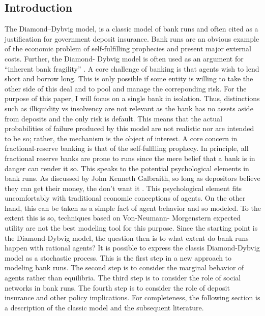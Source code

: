 \documentclass[12pt]{article}
\begin{document}
\begin{doublespace}
\section*{Introduction}
The Diamond--Dybvig model, \citet{diamond1983bank} is a classic model of bank runs and often cited as a justification for government deposit insurance. Bank runs are an obvious example of the economic
problem of self-fulfilling prophecies and present major external costs. Further, the Diamond-
Dybvig model is often used as an argument for “inherent bank fragility” \citet{white1999theory}.
A core challenge of banking is that agents wish to lend short and borrow long. This is only possible if some entity is
willing to take the other side of this deal and to pool and manage the correponding risk. For the purpose of this paper, I will
focus on a single bank in isolation. Thus, distinctions such as illiquidity vs insolvency are not relevant  as the bank has no assets aside from deposits and the only risk is default. This means that the actual probabilities of failure produced by this model are not realistic nor are intended to be so; rather, the mechanism is the object of interest.
 A core concern in fractional-reserve banking is that of the self-fulflling prophecy. In principle, all fractional reserve banks are prone to runs since the mere belief that a bank
is in danger can render it so. This speaks to the potential psychological elements in bank runs. As discussed by John Kenneth Galbraith,
so long as depositors believe they can get their money, the don’t want it \citet{galbraith2017money}.
 This psychological element fits uncomfortably with traditional economic conceptions of agents. On the other hand, this
can be taken as a simple fact of agent behavior and so modeled. To the extent this is so,
techniques based on Von-Neumann- Morgenstern expected utility are not the best modeling
tool for this purpose. Since the starting point is the Diamond-Dybvig model, the question then is to what extent do bank runs happen with rational agents? It is possible to express the classis Diamond-Dybvig model as a stochastic process. This is the first step in a new approach to modeling bank runs. The second step is to consider the marginal behavior of agents rather than equilibria. The third step is to consider the role of social networks in bank runs. The fourth step is to consider the role of deposit insurance and other policy implications.
For completeness, the following section is a description of the classic model and the subsequent literature.

\end{doublespace}
\end{document}
